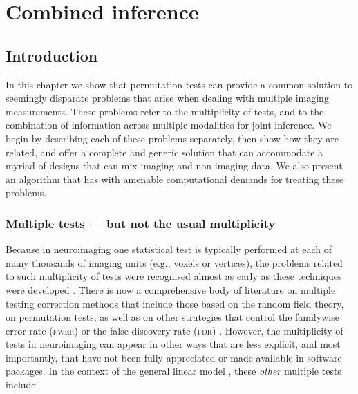 \chapter{Combined inference}
\label{sec:comb}
\setstretch{\lspac}





\section{Introduction}
\label{sec:comb:intro}

In this chapter we show that permutation tests can provide a common solution to seemingly disparate problems that arise when dealing with multiple imaging measurements. These problems refer to the multiplicity of tests, and to the combination of information across multiple modalities for joint inference. We begin by describing each of these problems separately, then show how they are related, and offer a complete and generic solution that can accommodate a myriad of designs that can mix imaging and non-imaging data. We also present an algorithm that has with amenable computational demands for treating these problems.

\subsection{Multiple tests --- but not the usual multiplicity}

Because in neuroimaging one statistical test is typically performed at each of many thousands of imaging units (e.g., voxels or vertices), the problems related to such multiplicity of tests were recognised almost as early as these techniques were developed \citep[for pioneering examples, see][]{Fox1988, Friston1991}. There is now a comprehensive body of literature on multiple testing correction methods that include those based on the random field theory, on permutation tests, as well as on other strategies that control the familywise error rate (\textsc{fwer}) or the false discovery rate (\textsc{fdr}) \citep[for reviews, see][]{Nichols2003, Nichols2012}. However, the multiplicity of tests in neuroimaging can appear in other ways that are less explicit, and most importantly, that have not been fully appreciated or made available in software packages. In the context of the general linear model \citep[\textsc{glm},][]{Scheffe1959}, these \emph{other} multiple tests include:

